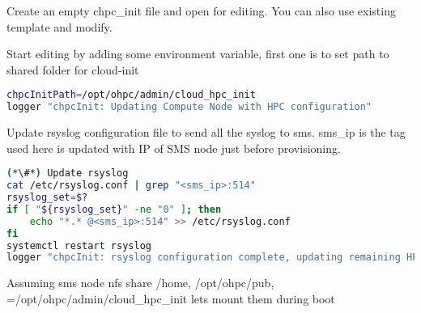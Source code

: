 Create an empty chpc\_init file and open for editing. You can also use existing template and modify.

Start editing by adding some environment variable, first one is to set path to shared folder for cloud-init

\begin{lstlisting}[language=bash,keywords={}]
chpcInitPath=/opt/ohpc/admin/cloud_hpc_init
logger "chpcInit: Updating Compute Node with HPC configuration"
\end{lstlisting}

Update rsyslog configuration file to send all the syslog to sms. sms\_ip is the tag used here is updated with IP of SMS node just before provisioning.

\begin{lstlisting}[language=bash,keywords={}]
(*\#*) Update rsyslog
cat /etc/rsyslog.conf | grep "<sms_ip>:514"
rsyslog_set=$?
if [ "${rsyslog_set}" -ne "0" ]; then
    echo "*.* @<sms_ip>:514" >> /etc/rsyslog.conf
fi
systemctl restart rsyslog
logger "chpcInit: rsyslog configuration complete, updating remaining HPC configuration"
\end{lstlisting}

Assuming sms node nfs share /home, /opt/ohpc/pub, =/opt/ohpc/admin/cloud\_hpc\_init lets mount them during boot

